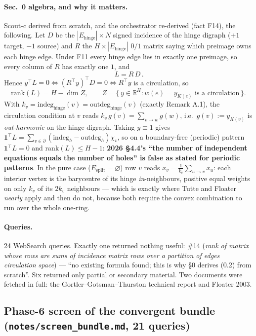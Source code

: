 \documentclass[10pt,a4paper]{article}
\begin{document}
\paragraph{Sec.~0 algebra, and why it matters.} Scout-c derived from scratch, and the
orchestrator re-derived (fact F14), the following. Let $D$ be the
$|E_{\mathrm{hinge}}|\times N$ signed incidence of the hinge digraph ($+1$ target, $-1$ source)
and $R$ the $H\times|E_{\mathrm{hinge}}|$ $0/1$ matrix saying which preimage owns each hinge
edge. Under F11 every hinge edge lies in exactly one preimage, so every column of $R$ has
exactly one $1$, and
\[
\boxed{\,L = R\,D\,}.
\]
Hence $y^{\!\top}L = 0 \iff (R^{\!\top}y)^{\!\top} D = 0 \iff R^{\!\top}y$ is a circulation, so
\[
\mathrm{rank}(L) = H - \dim Z,\qquad
Z = \{\, y\in\mathbb R^H : w(e) = y_{K(e)} \text{ is a circulation}\,\}.
\]
With $k_v = \mathrm{indeg}_{\mathrm{hinge}}(v) = \mathrm{outdeg}_{\mathrm{hinge}}(v)$ (exactly
Remark A.1), the circulation condition at $v$ reads $k_v\, g(v) = \sum_{v\to w} g(w)$, i.e.\
$g(v) := y_{K(v)}$ is \emph{out-harmonic} on the hinge digraph. Taking $y\equiv 1$ gives
$\mathbf 1^{\!\top}L = \sum_{v\in\partial}(\mathrm{indeg}_h - \mathrm{outdeg}_h)\chi_v$, so on a
boundary-free (periodic) pattern $\mathbf 1^{\!\top}L = 0$ and $\mathrm{rank}(L)\le H-1$:
\textbf{2026 \S4.4's ``the number of independent equations equals the number of holes'' is
false as stated for periodic patterns}. In the pure case ($E_{\mathrm{split}}=\varnothing$) row
$v$ reads $x_v = \frac{1}{k_v}\sum_{u\to v} x_u$: each interior vertex is the barycentre of its
hinge \emph{in}-neighbours, positive equal weights on only $k_v$ of its $2k_v$ neighbours ---
which is exactly where Tutte and Floater \emph{nearly} apply and then do not, because both
require the convex combination to run over the whole one-ring.

\paragraph{Queries.} 24 WebSearch queries. Exactly one returned nothing useful: \#14
(\emph{rank of matrix whose rows are sums of incidence matrix rows over a partition of edges
circulation space}) --- ``no existing formula found; this is why \S0 derives (0.2) from
scratch''. Six returned only partial or secondary material. Two documents were fetched in
full: the Gortler--Gotsman--Thurston technical report and Floater 2003.

\subsection{Phase-6 screen of the convergent bundle (\texttt{notes/screen\_bundle.md}, 21 queries)}
\end{document}
